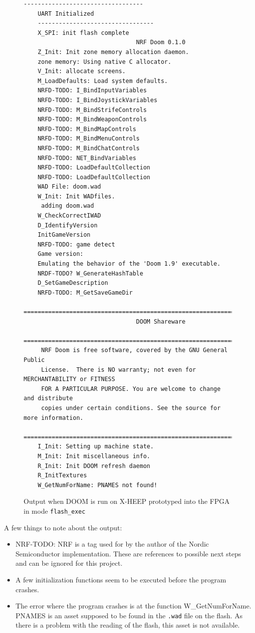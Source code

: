 \begin{figure}[h!]
{\fontsize{9}{11}\selectfont
\begin{Verbatim}[frame=single]
    ----------------------------------
    UART Initialized
    ---------------------------------
    X_SPI: init flash complete
                                NRF Doom 0.1.0
    Z_Init: Init zone memory allocation daemon. 
    zone memory: Using native C allocator.
    V_Init: allocate screens.
    M_LoadDefaults: Load system defaults.
    NRFD-TODO: I_BindInputVariables
    NRFD-TODO: I_BindJoystickVariables
    NRFD-TODO: M_BindStrifeControls
    NRFD-TODO: M_BindWeaponControls
    NRFD-TODO: M_BindMapControls
    NRFD-TODO: M_BindMenuControls
    NRFD-TODO: M_BindChatControls
    NRFD-TODO: NET_BindVariables
    NRFD-TODO: LoadDefaultCollection
    NRFD-TODO: LoadDefaultCollection
    WAD File: doom.wad
    W_Init: Init WADfiles.
     adding doom.wad
    W_CheckCorrectIWAD
    D_IdentifyVersion
    InitGameVersion
    NRFD-TODO: game detect
    Game version: 
    Emulating the behavior of the 'Doom 1.9' executable.
    NRDF-TODO? W_GenerateHashTable
    D_SetGameDescription
    NRFD-TODO: M_GetSaveGameDir
    ===========================================================================
                                DOOM Shareware
    ===========================================================================
     NRF Doom is free software, covered by the GNU General Public
     License.  There is NO warranty; not even for MERCHANTABILITY or FITNESS
     FOR A PARTICULAR PURPOSE. You are welcome to change and distribute
     copies under certain conditions. See the source for more information.
    ===========================================================================
    I_Init: Setting up machine state.
    M_Init: Init miscellaneous info.
    R_Init: Init DOOM refresh daemon
    R_InitTextures
    W_GetNumForName: PNAMES not found!
\end{Verbatim}
}
\caption{Output when DOOM is run on X-HEEP prototyped into the FPGA in mode \texttt{flash\_exec}}
\label{fig:cutecomOutput}
\end{figure}

A few things to note about the output: \\

\begin{itemize}
    \item NRF-TODO: NRF is a tag used for by the author of the Nordic Semiconductor implementation. These are references to possible next steps and can be ignored for this project.
    \item A few initialization functions seem to be executed before the program crashes.
    \item The error where the program crashes is at the function W\_GetNumForName. PNAMES is an asset supposed to be found in the \texttt{.wad} file on the flash. As there is a problem with the reading of the flash, this asset is not available. 
 \end{itemize}